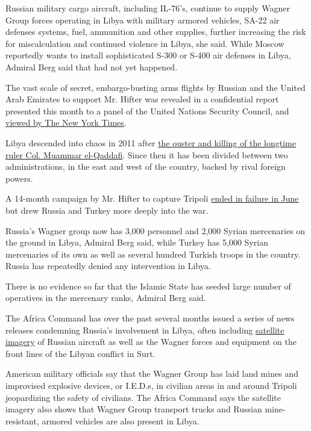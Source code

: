 Russian military cargo aircraft, including IL-76's, continue to supply
Wagner Group forces operating in Libya with military armored vehicles,
SA-22 air defenses systems, fuel, ammunition and other supplies, further
increasing the risk for miscalculation and continued violence in Libya,
she said. While Moscow reportedly wants to install sophisticated S-300
or S-400 air defenses in Libya, Admiral Berg said that had not yet
happened.

The vast scale of secret, embargo-busting arms flights by Russian and
the United Arab Emirates to support Mr. Hifter was revealed in a
confidential report presented this month to a panel of the United
Nations Security Council, and
\href{https://www.nytimes3xbfgragh.onion/2020/09/03/world/middleeast/libya-russia-emirates-mercenaries.html}{viewed
by The New York Times}.

Libya descended into chaos in 2011 after
\href{https://www.nytimes3xbfgragh.onion/2011/10/21/world/africa/qaddafi-is-killed-as-libyan-forces-take-surt.html}{the
ouster and killing of the longtime ruler Col. Muammar el-Qaddafi}. Since
then it has been divided between two administrations, in the east and
west of the country, backed by rival foreign powers.

A 14-month campaign by Mr. Hifter to capture Tripoli
\href{https://www.nytimes3xbfgragh.onion/2020/06/04/world/middleeast/libya-hifter-retreat-russia.html}{ended
in failure in June} but drew Russia and Turkey more deeply into the war.

Russia's Wagner group now has 3,000 personnel and 2,000 Syrian
mercenaries on the ground in Libya, Admiral Berg said, while Turkey has
5,000 Syrian mercenaries of its own as well as several hundred Turkish
troops in the country. Russia has repeatedly denied any intervention in
Libya.

There is no evidence so far that the Islamic State has seeded large
number of operatives in the mercenary ranks, Admiral Berg said.

The Africa Command has over the past several months issued a series of
news releases condemning Russia's involvement in Libya, often including
\href{https://www.africom.mil/pressrelease/33034/russia-and-the-wagner-group-continue-to-be-in}{satellite
imagery} of Russian aircraft as well as the Wagner forces and equipment
on the front lines of the Libyan conflict in Surt.

American military officials say that the Wagner Group has laid land
mines and improvised explosive devices, or I.E.D.s, in civilian areas in
and around Tripoli jeopardizing the safety of civilians. The Africa
Command says the satellite imagery also shows that Wagner Group
transport trucks and Russian mine-resistant, armored vehicles are also
present in Libya.

